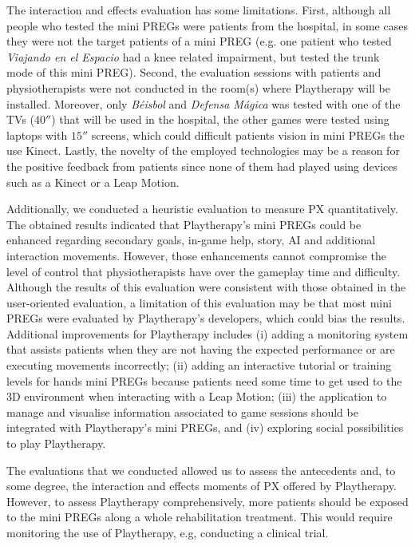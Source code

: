 The interaction and effects evaluation has some limitations. First, although all people who tested the mini \acp{PREG} were patients from the hospital, in some cases they were not the target patients of a mini \ac{PREG} (e.g. one patient who tested \textit{Viajando en el Espacio} had a knee related impairment, but tested the trunk mode of this mini \ac{PREG}). Second, the evaluation sessions with patients and physiotherapists were not conducted in the room(s) where Playtherapy will be installed. Moreover, only \textit{B\'eisbol} and \textit{Defensa M\'agica} was tested with one of the TVs ($40''$) that will be used in the hospital, the other games were tested using laptops with $15''$ screens, which could difficult patients vision in mini \acp{PREG} the use Kinect. Lastly, the novelty of the employed technologies may be a reason for the positive feedback from patients since none of them had played using devices such as a Kinect or a Leap Motion.

Additionally, we conducted a heuristic evaluation to measure \ac{PX} quantitatively. The obtained results indicated that Playtherapy's mini \acp{PREG} could be enhanced regarding secondary goals, in-game help, story, \ac{AI} and additional interaction movements. However, those enhancements cannot compromise the level of control that physiotherapists have over the gameplay time and difficulty. Although the results of this evaluation were consistent with those obtained in the user-oriented evaluation, a limitation of this evaluation may be that most mini \acp{PREG} were evaluated by Playtherapy's developers, which could bias the results.
Additional improvements for Playtherapy includes (i) adding a monitoring system that assists patients when they are not having the expected performance or are executing movements incorrectly; (ii) adding an interactive tutorial or training levels for hands mini \acp{PREG} because patients need some time to get used to the 3D environment when interacting with a Leap Motion; (iii) the application to manage and visualise information associated to game sessions should be integrated with Playtherapy's mini \acp{PREG}, and (iv) exploring social possibilities to play Playtherapy.

The evaluations that we conducted allowed us to assess the antecedents and, to some degree, the interaction and effects moments of \ac{PX} offered by Playtherapy. However, to assess Playtherapy comprehensively, more patients should be exposed to the mini \acp{PREG} along a whole rehabilitation treatment. This would require monitoring the use of Playtherapy, e.g, conducting a clinical trial.

